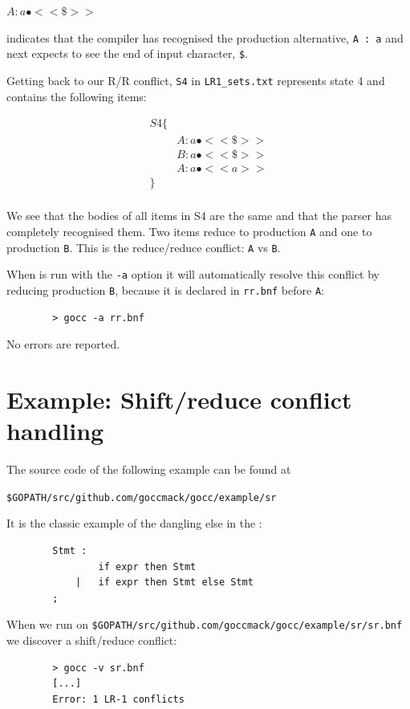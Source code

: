 \documentclass[12pt]{article}
\begin{document}
	$A : a\bullet <<\$>>$

	indicates that the compiler has recognised the production alternative, \verb|A : a| and  next expects to see the end of input character, \verb|$|.

	Getting back to our R/R conflict, \verb|S4|  in \verb|LR1_sets.txt| represents state 4 and contains the following items:

	\[
		\begin{array}{ll}
			S4 \{ \\
			    & A : a\bullet  <<\$>> \\
			    & B : a\bullet  <<\$>> \\
			    & A : a\bullet  <<a>> \\
			\} \\
		\end{array}
	\]

	We see that the bodies of all items in S4 are the same and that the parser has completely recognised them. Two items reduce to production \verb|A| and one to production \verb|B|. This is the reduce/reduce conflict: \verb|A| vs \verb|B|.

	When \gocc is run with the \verb|-a| option it will automatically resolve this conflict by reducing production \verb|B|, because it is declared in \verb|rr.bnf| before \verb|A|:

	\begin{verbatim}
		> gocc -a rr.bnf
	\end{verbatim}
	No errors are reported. 


\section{Example: Shift/reduce conflict handling} \label{sec:example sr}
	The source code of the following example can be found at

	\verb|$GOPATH/src/github.com/goccmack/gocc/example/sr|

	It is the classic example of the dangling else in the \Clang:

	\begin{verbatim}
		Stmt :
		        if expr then Stmt
		    |   if expr then Stmt else Stmt
		;
	\end{verbatim}

	When we run \gocc on \verb|$GOPATH/src/github.com/goccmack/gocc/example/sr/sr.bnf| we discover a shift/reduce conflict:

	\begin{verbatim}
		> gocc -v sr.bnf
		[...]
		Error: 1 LR-1 conflicts
	\end{verbatim}
\end{document}
